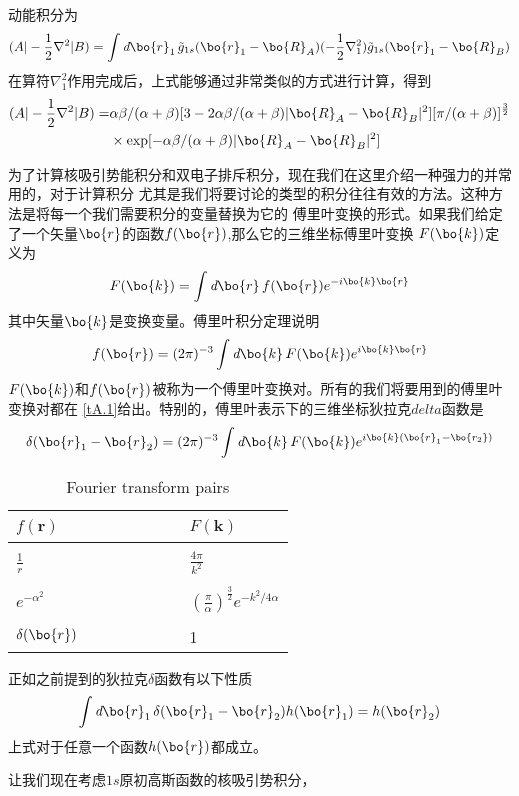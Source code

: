 动能积分为
\begin{align}
	\label{A.10}
	(A|-\frac{1}{2}\nabla^2|B)=\int \emph{d}\bo{r}_1\,\tilde{g}_{1s}(\bo{r}_1-\bo{R}_A)(-\frac{1}{2}\nabla_1^2)\tilde{g}_{1s}(\bo{r}_1-\bo{R}_B)
\end{align}
在算符$\nabla_1^2$作用完成后，上式能够通过非常类似的方式进行计算，得到
\begin{align}
	\label{A.11}
	(A|-\frac{1}{2}\nabla^2|B)=&\alpha\beta/(\alpha+\beta)[3-2\alpha\beta/(\alpha+\beta)\lvert \bo{R}_A-\bo{R}_B \rvert ^2][\pi/(\alpha+\beta)]^{\frac{3}{2}}\nonumber\\
	&\times\exp[-\alpha\beta/(\alpha+\beta)\lvert \bo{R}_A-\bo{R}_B \rvert ^2]
\end{align}

为了计算核吸引势能积分和双电子排斥积分，现在我们在这里介绍一种强力的并常用的，对于计算积分
尤其是我们将要讨论的类型的积分往往有效的方法。这种方法是将每一个我们需要积分的变量替换为它的
傅里叶变换的形式。如果我们给定了一个矢量$\bo{r}$的函数$f(\bo{r})$,那么它的三维坐标傅里叶变换
$F(\bo{k})$定义为
\begin{align}
	\label{A.12}
	F(\bo{k})=\int \emph{d}\bo{r}\,f(\bo{r})e^{-i\bo{k}\bo{r}}
\end{align}
其中矢量$\bo{k}$是变换变量。傅里叶积分定理说明
\begin{align}
	\label{A.13}
	f(\bo{r})=(2\pi)^{-3}\int \emph{d}\bo{k}\,F(\bo{k})e^{i\bo{k}\bo{r}}
\end{align}
$F(\bo{k})$和$f(\bo{r})$被称为一个傅里叶变换对。所有的我们将要用到的傅里叶变换对都在
\autoref{tA.1}给出。特别的，傅里叶表示下的三维坐标狄拉克$delta$函数是
\begin{align}
	\label{A.14}
	\delta(\bo{r}_1-\bo{r}_2)=(2\pi)^{-3}\int \emph{d}\bo{k}\,F(\bo{k})e^{i\bo{k}(\bo{r}_1-\bo{r_2})}
\end{align}

\begin{table}[h!] 
	\label{tA.1}
	\caption{Fourier transform pairs}
	\centering
	\begin{tabular}{lll}
		\hline 
		$f(\bm{r})$ & ~~~~ ~~~~& $F(\bm{k})$ \\ \hline \\
		$\frac{1}{r}$&  ~~~~ ~~~~& $\frac{4\pi}{k^2}$ \\
		\\
		$e^{-\alpha^2}$ & ~~~~ ~~~~ & $(\frac{\pi}{\alpha})^{\frac{3}{2}}e^{-k^2/{4\alpha}}$\\
		\\
		$\delta(\bo{r})$& ~~~~ ~~~~ &1
	\\ \hline
	\end{tabular}
\end{table}
正如之前提到的狄拉克$\delta$函数有以下性质
\begin{align}
	\label{A.15}
	\int \emph{d}\bo{r}_1\,\delta(\bo{r}_1-\bo{r}_2)h(\bo{r}_1)=h(\bo{r}_2)
\end{align}
上式对于任意一个函数$h(\bo{r})$都成立。

让我们现在考虑$1s$原初高斯函数的核吸引势积分，

\newpage
\theendnotes
{}
